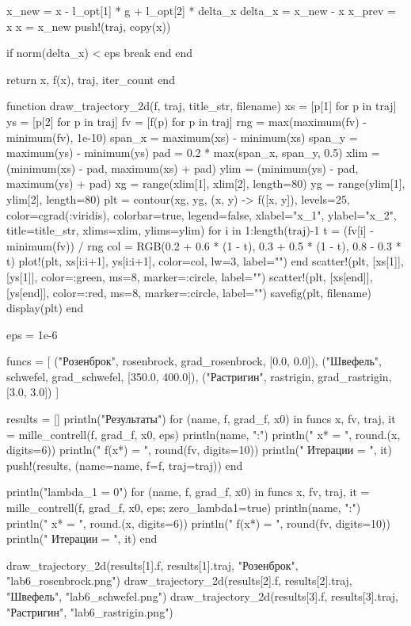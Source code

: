 \documentclass[a4paper, 14pt]{extarticle}
\begin{document}
\begin{breakablelisting}
        x_new = x - l_opt[1] * g + l_opt[2] * delta_x
        delta_x = x_new - x
        x_prev = x
        x = x_new
        push!(traj, copy(x))

        if norm(delta_x) < eps
            break
        end
    end

    return x, f(x), traj, iter_count
end

function draw_trajectory_2d(f, traj, title_str, filename)
    xs = [p[1] for p in traj]
    ys = [p[2] for p in traj]
    fv = [f(p) for p in traj]
    rng = max(maximum(fv) - minimum(fv), 1e-10)
    span_x = maximum(xs) - minimum(xs)
    span_y = maximum(ys) - minimum(ys)
    pad = 0.2 * max(span_x, span_y, 0.5)
    xlim = (minimum(xs) - pad, maximum(xs) + pad)
    ylim = (minimum(ys) - pad, maximum(ys) + pad)
    xg = range(xlim[1], xlim[2], length=80)
    yg = range(ylim[1], ylim[2], length=80)
    plt = contour(xg, yg, (x, y) -> f([x, y]), levels=25, color=cgrad(:viridis), colorbar=true, legend=false, xlabel="x_1", ylabel="x_2", title=title_str, xlims=xlim, ylims=ylim)
    for i in 1:length(traj)-1
        t = (fv[i] - minimum(fv)) / rng
        col = RGB(0.2 + 0.6 * (1 - t), 0.3 + 0.5 * (1 - t), 0.8 - 0.3 * t)
        plot!(plt, xs[i:i+1], ys[i:i+1], color=col, lw=3, label="")
    end
    scatter!(plt, [xs[1]], [ys[1]], color=:green, ms=8, marker=:circle, label="")
    scatter!(plt, [xs[end]], [ys[end]], color=:red, ms=8, marker=:circle, label="")
    savefig(plt, filename)
    display(plt)
end

eps = 1e-6

funcs = [
    ("Розенброк", rosenbrock, grad_rosenbrock, [0.0, 0.0]),
    ("Швефель", schwefel, grad_schwefel, [350.0, 400.0]),
    ("Растригин", rastrigin, grad_rastrigin, [3.0, 3.0])
]

results = []
println("Результаты")
for (name, f, grad_f, x0) in funcs
    x, fv, traj, it = mille_contrell(f, grad_f, x0, eps)
    println(name, ":")
    println("  x* = ", round.(x, digits=6))
    println("  f(x*) = ", round(fv, digits=10))
    println("  Итерации = ", it)
    push!(results, (name=name, f=f, traj=traj))
end

println("\n lambda_1 = 0")
for (name, f, grad_f, x0) in funcs
    x, fv, traj, it = mille_contrell(f, grad_f, x0, eps; zero_lambda1=true)
    println(name, ":")
    println("  x* = ", round.(x, digits=6))
    println("  f(x*) = ", round(fv, digits=10))
    println("  Итерации = ", it)
end

draw_trajectory_2d(results[1].f, results[1].traj, "Розенброк", "lab6_rosenbrock.png")
draw_trajectory_2d(results[2].f, results[2].traj, "Швефель", "lab6_schwefel.png")
draw_trajectory_2d(results[3].f, results[3].traj, "Растригин", "lab6_rastrigin.png")
\end{breakablelisting}
\end{document}
